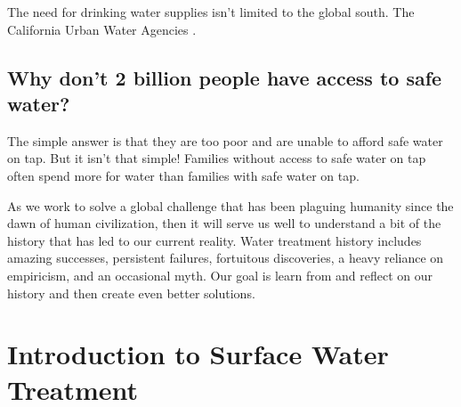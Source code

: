 \documentclass[letterpaper,10pt,english]{sphinxmanual}
\begin{document}
The need for drinking water supplies isn’t limited to the global south. The California Urban Water Agencies .


\subsection{Why don’t 2 billion people have access to safe water?}
\label{\detokenize{Introduction/Introduction:why-don-t-2-billion-people-have-access-to-safe-water}}\label{\detokenize{Introduction/Introduction:heading-2-billion-without-access-to-safe-water}}
The simple answer is that they are too poor and are unable to afford safe water on tap. But it isn’t that simple! Families without access to safe water on tap often spend more for water than families with safe water on tap.

As we work to solve a global challenge that has been plaguing humanity since the dawn of human civilization, then it will serve us well to understand a bit of the history that has led to our current reality. Water treatment history includes amazing successes, persistent failures, fortuitous discoveries, a heavy reliance on empiricism, and an occasional myth. Our goal is learn from and reflect on our history and then create even better solutions.


\section{Introduction to Surface Water Treatment}
\label{\detokenize{Introduction/Introduction:introduction-to-surface-water-treatment}}\label{\detokenize{Introduction/Introduction:heading-introduction-to-surface-water-treatment}}
\end{document}
